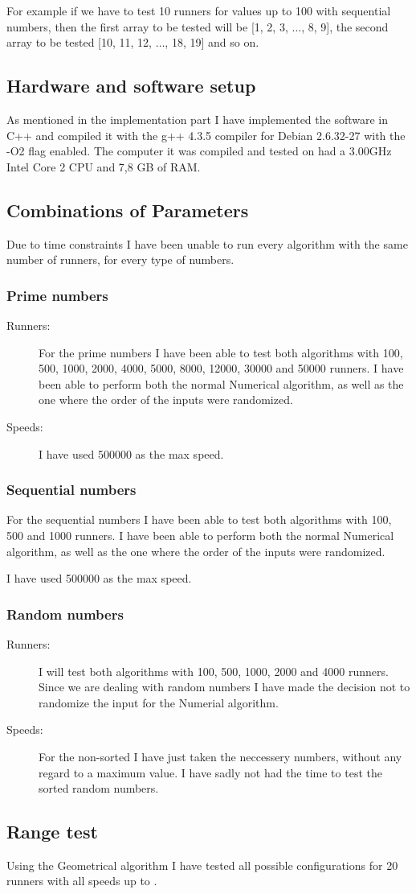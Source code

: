 For example if we have to test 10 runners for values up to 100 with sequential numbers, then the first array to be tested will be [1, 2, 3, $\ldots$, 8, 9], the second array to be tested [10, 11, 12, $\ldots$, 18, 19] and so on.

\subsection{Hardware and software setup}
As mentioned in the implementation part I have implemented the software in C++ and compiled it with the g++ 4.3.5 compiler for Debian 2.6.32-27 with the -O2 flag enabled. The computer it was compiled and tested on had a 3.00GHz Intel Core 2 CPU and 7,8 GB of RAM.

\subsection{Combinations of Parameters} 

Due to time constraints I have been unable to run every algorithm with the same number of runners, for every type of numbers.

\subsubsection{Prime numbers}
\begin{description}
\item[Runners:]For the prime numbers I have been able to test both algorithms with 100, 500, 1000, 2000, 4000, 5000, 8000, 12000, 30000 and 50000 runners. I have been able to perform both the normal Numerical algorithm, as well as the one where the order of the inputs were randomized.  
\item[Speeds:] I have used 500000 as the max speed.
\end{description}

\subsubsection{Sequential numbers}
\item[Runners:]For the sequential numbers I have been able to test both algorithms with 100, 500 and 1000 runners. I have been able to perform both the normal Numerical algorithm, as well as the one where the order of the inputs were randomized.  
\item[Speeds:] I have used 500000 as the max speed.

\subsubsection{Random numbers}
\begin{description}
\item[Runners:] I will test both algorithms with 100, 500, 1000, 2000 and 4000 runners. Since we are dealing with random numbers I have made the decision not to randomize the input for the Numerial algorithm.
\item[Speeds:] For the non-sorted I have just taken the neccessery numbers, without any regard to a maximum value. I have sadly not had the time to test the sorted random numbers. 
\end{description}

\subsection{Range test}
Using the Geometrical algorithm I have tested all possible configurations for 20 runners with all speeds up to \maxNumbers.
